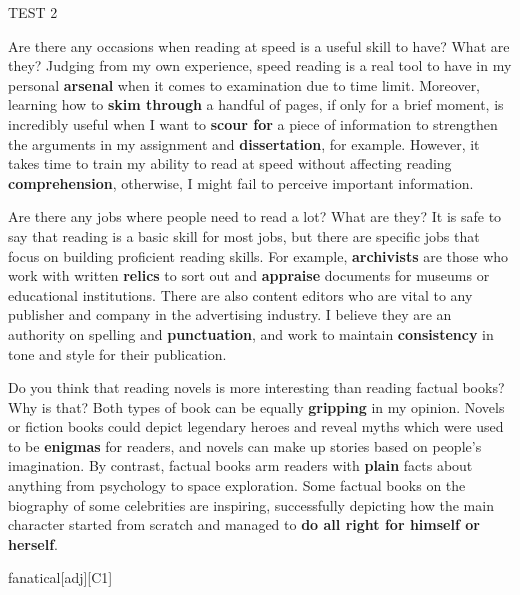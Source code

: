 \begin{glossarymc}[Cambridge 11]
\begin{test}{TEST 2}
    \begin{qa}{Are there any occasions when reading at speed is a useful skill to have? What are they?}
    Judging from my own experience, speed reading is a real tool to have in my personal \textbf{arsenal} when it comes to examination due to time limit. Moreover, learning how to \textbf{skim through} a handful of pages, if only for a brief moment, is incredibly useful when I want to \textbf{scour for} a piece of information to strengthen the arguments in my assignment and \textbf{dissertation}, for example. However, it takes time to train my ability to read at speed without affecting reading \textbf{comprehension}, otherwise, I might fail to perceive important information.
    \end{qa}

    \begin{qa}{Are there any jobs where people need to read a lot? What are they?}
    It is safe to say that reading is a basic skill for most jobs, but there are specific jobs that focus on building proficient reading skills. For example, \textbf{archivists} are those who work with written \textbf{relics} to sort out and \textbf{appraise} documents for museums or educational institutions. There are also content editors who are vital to any publisher and company in the advertising industry. I believe they are an authority on spelling and \textbf{punctuation}, and work to maintain \textbf{consistency} in tone and style for their publication.
    \end{qa}

    \begin{qa}{Do you think that reading novels is more interesting than reading factual books? Why is that?}
    Both types of book can be equally \textbf{gripping} in my opinion. Novels or fiction books could depict legendary heroes and reveal myths which were used to be \textbf{enigmas} for readers, and novels can make up stories based on people’s imagination. By contrast, factual books arm readers with \textbf{plain} facts about anything from psychology to space exploration. Some factual books on the biography of some celebrities are inspiring, successfully depicting how the main character started from scratch and managed to \textbf{do all right for himself or herself}.
    \end{qa}

        \begin{VocabExplain}[Part 3]
            \begin{ExplainCard}{fanatical}[adj][C1]
            \end{ExplainCard}


\end{VocabExplain}
\end{test}
\end{glossarymc}
